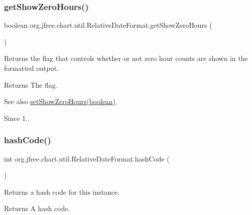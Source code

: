 \subsubsection{\texorpdfstring{get\+Show\+Zero\+Hours()}{getShowZeroHours()}}
{\footnotesize\ttfamily boolean org.\+jfree.\+chart.\+util.\+Relative\+Date\+Format.\+get\+Show\+Zero\+Hours (\begin{DoxyParamCaption}{ }\end{DoxyParamCaption})}

Returns the flag that controls whether or not zero hour counts are shown in the formatted output.

\begin{DoxyReturn}{Returns}
The flag.
\end{DoxyReturn}
\begin{DoxySeeAlso}{See also}
\mbox{\hyperlink{classorg_1_1jfree_1_1chart_1_1util_1_1_relative_date_format_aac19e1c8e60280bae7a59223ac11aee2}{set\+Show\+Zero\+Hours(boolean)}}
\end{DoxySeeAlso}
\begin{DoxySince}{Since}
1.. 
\end{DoxySince}
\mbox{\label{classorg_1_1jfree_1_1chart_1_1util_1_1_relative_date_format_a5a2a76349ac769f511ba904caca78560}} 
\subsubsection{\texorpdfstring{hash\+Code()}{hashCode()}}
{\footnotesize\ttfamily int org.\+jfree.\+chart.\+util.\+Relative\+Date\+Format.\+hash\+Code (\begin{DoxyParamCaption}{ }\end{DoxyParamCaption})}

Returns a hash code for this instance.

\begin{DoxyReturn}{Returns}
A hash code. 
\end{DoxyReturn}
\mbox{\label{classorg_1_1jfree_1_1chart_1_1util_1_1_relative_date_format_a40d4787b658f06db339b14eeeb771d0b}} 
